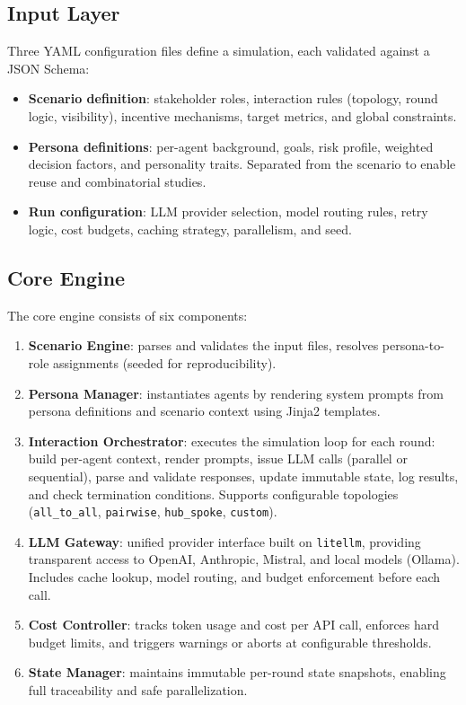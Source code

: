 \documentclass[12pt, a4paper]{article}
\begin{document}
\subsection*{Input Layer}

Three YAML configuration files define a simulation, each validated against a JSON Schema:
\begin{itemize}
    \item \textbf{Scenario definition}: stakeholder roles, interaction rules (topology, round logic, visibility), incentive mechanisms, target metrics, and global constraints.
    \item \textbf{Persona definitions}: per-agent background, goals, risk profile, weighted decision factors, and personality traits. Separated from the scenario to enable reuse and combinatorial studies.
    \item \textbf{Run configuration}: LLM provider selection, model routing rules, retry logic, cost budgets, caching strategy, parallelism, and seed.
\end{itemize}

\subsection*{Core Engine}

The core engine consists of six components:
\begin{enumerate}
    \item \textbf{Scenario Engine}: parses and validates the input files, resolves persona-to-role assignments (seeded for reproducibility).
    \item \textbf{Persona Manager}: instantiates agents by rendering system prompts from persona definitions and scenario context using Jinja2 templates.
    \item \textbf{Interaction Orchestrator}: executes the simulation loop for each round: build per-agent context, render prompts, issue LLM calls (parallel or sequential), parse and validate responses, update immutable state, log results, and check termination conditions. Supports configurable topologies (\texttt{all\_to\_all}, \texttt{pairwise}, \texttt{hub\_spoke}, \texttt{custom}).
    \item \textbf{LLM Gateway}: unified provider interface built on \texttt{litellm}, providing transparent access to OpenAI, Anthropic, Mistral, and local models (Ollama). Includes cache lookup, model routing, and budget enforcement before each call.
    \item \textbf{Cost Controller}: tracks token usage and cost per API call, enforces hard budget limits, and triggers warnings or aborts at configurable thresholds.
    \item \textbf{State Manager}: maintains immutable per-round state snapshots, enabling full traceability and safe parallelization.
\end{enumerate}
\end{document}
